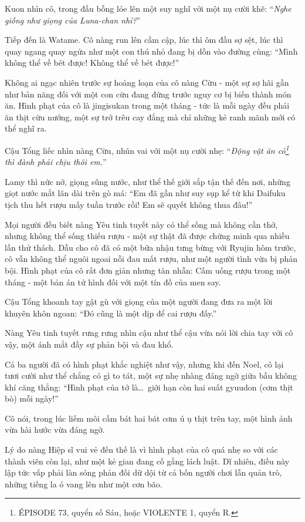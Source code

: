 \documentclass[../main.tex]{subfiles}
\begin{document}
Kuon nhìn cô, trong đầu bỗng lóe lên một suy nghĩ với một nụ cười khẽ: ``\textit{Nghe giống như giọng của Luna-chan nhỉ?}''

Tiếp đến là Watame. Cô nàng run lên cầm cập, lúc thì ôm đầu sợ sệt, lúc thì quay ngang quay ngửa như một con thú nhỏ đang bị dồn vào đường cùng: ``Mình không thể về bét được! Không thể về bét được!''

Không ai ngạc nhiên trước sự hoảng loạn của cô nàng Cừu - một sự sợ hãi gần như bản năng đối với một con cừu đang đứng trước nguy cơ bị biến thành món ăn. Hình phạt của cô là jingisukan trong một tháng - tức là mỗi ngày đều phải ăn thịt cừu nướng, một sự trớ trêu cay đắng mà chỉ những kẻ ranh mãnh mới có thể nghĩ ra.

Cậu Tổng liếc nhìn nàng Cừu, nhún vai với một nụ cười nhẹ: ``\textit{Động vật ăn cỏ\footnote{{\flaregothic ÉPISODE 73}, quyển số Sáu, hoặc {\flaregothic VIOLENTE 1}, quyển R.} thì đành phải chịu thôi em.}''

Lamy thì nức nở, giọng sũng nước, như thể thế giới sắp tận thế đến nơi, những giọt nước mắt lăn dài trên gò má: ``Em đã gần như suy sụp kể từ khi Daifuku tịch thu hết rượu mấy tuần trước rồi! Em sẽ quyết không thua đâu!''

Mọi người đều biết nàng Yêu tinh tuyết này có thể sống mà không cần thở, nhưng không thể sống thiếu rượu - một sự thật đã được chứng minh qua nhiều lần thử thách. Dẫu cho cô đã có một bữa nhậu tưng bừng với Ryujin hôm trước, cô vẫn không thể nguôi ngoai nỗi đau mất rượu, như một người tình vừa bị phản bội. Hình phạt của cô rất đơn giản nhưng tàn nhẫn: Cấm uống rượu trong một tháng - một bản án tử hình đối với một tín đồ của men say.

Cậu Tổng khoanh tay gật gù với giọng của một người đang đưa ra một lời khuyên khôn ngoan: ``Đó cũng là một dịp để cai rượu đấy.''

Nàng Yêu tinh tuyết rưng rưng nhìn cậu như thể cậu vừa nói lời chia tay với cô vậy, một ánh mắt đầy sự phản bội và đau khổ.

Cả ba người đã có hình phạt khắc nghiệt như vậy, nhưng khi đến Noel, cô lại tươi cười như thể chẳng có gì to tát, một sự nhẹ nhàng đáng ngờ giữa bầu không khí căng thẳng: ``Hình phạt của tớ là\dots\ giới hạn còn hai suất gyuudon (cơm thịt bò) mỗi ngày!''

Cô nói, trong lúc liếm môi cầm bát hai bát cơm ú ụ thịt trên tay, một hình ảnh vừa hài hước vừa đáng ngờ.

Lý do nàng Hiệp sĩ vui vẻ đến thế là vì hình phạt của cô quá nhẹ so với các thành viên còn lại, như một kẻ gian đang cố gắng lách luật. Dĩ nhiên, điều này lập tức vấp phải làn sóng phản đối dữ dội từ cả bốn người chơi lẫn quản trò, những tiếng la ó vang lên như một cơn bão.
\end{document}
